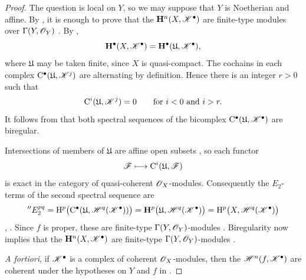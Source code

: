 \begin{proof}
The question is local on $Y$, so we may suppose that $Y$ is
Noetherian and affine.  By , it is enough to prove
that the $\mathbf{H}^n(X,\mathscr{K}^\bullet)$ are finite-type modules
over $\Gamma(Y,\mathscr{O}_Y)$ .  By
,
\[
  \mathbf{H}^\bullet(X,\mathscr{K}^\bullet)
  =
  \mathbf{H}^\bullet(\mathfrak{U},\mathscr{K}^\bullet),
\]
where $\mathfrak{U}$ may be taken finite, since $X$ is
quasi-compact.  The cochains in each complex
$\mathrm{C}^\bullet(\mathfrak{U},\mathscr{K}^j)$ are alternating by
definition.  Hence there is an integer $r>0$ such that
\[
  \mathrm{C}^i(\mathfrak{U},\mathscr{K}^j)=0
  \qquad\text{for }i<0\text{ and }i>r.
\]
It follows from  that both spectral sequences of
the bicomplex
$\mathrm{C}^\bullet(\mathfrak{U},\mathscr{K}^\bullet)$ are biregular.

Intersections of members of $\mathfrak{U}$ are affine open subsets
, so each functor
\[
  \mathscr{F}\longmapsto\mathrm{C}^i(\mathfrak{U},\mathscr{F})
\]
is exact in the category of quasi-coherent $\mathscr{O}_X$-modules.
Consequently the $E_2$-terms of the second spectral sequence are
\[
  ''E_2^{pq}
  =
  \mathrm{H}^p\bigl(
    \mathrm{C}^\bullet(
      \mathfrak{U},\mathscr{H}^q(\mathscr{K}^\bullet)
    )
  \bigr)
  =
  \mathbf{H}^p\bigl(
    \mathfrak{U},\mathscr{H}^q(\mathscr{K}^\bullet)
  \bigr)
  =
  \mathrm{H}^p\bigl(X,\mathscr{H}^q(\mathscr{K}^\bullet)\bigr)
\]
, .  Since $f$ is proper, these
are finite-type $\Gamma(Y,\mathscr{O}_Y)$-modules
.  Biregularity now implies that the
$\mathbf{H}^n(X,\mathscr{K}^\bullet)$ are finite-type
$\Gamma(Y,\mathscr{O}_Y)$-modules .

\emph{A fortiori}, if $\mathscr{K}^\bullet$ is a complex of coherent
$\mathscr{O}_X$-modules, then the
$\mathscr{H}^n(f,\mathscr{K}^\bullet)$ are coherent under the
hypotheses on $Y$ and $f$ in 
.
\end{proof}

